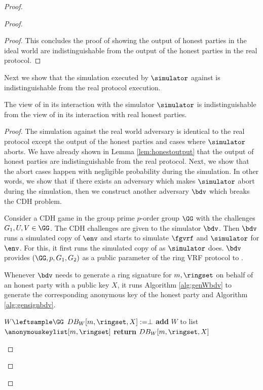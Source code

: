 \begin{proof}
\begin{proof}
\begin{proof}
			This concludes the proof of showing the output of honest parties in the ideal world are indistinguishable from the output of the honest parties in the real protocol.
		\end{proof}	
		
		Next we show that the simulation executed by $ \simulator $ against \adv is indistinguishable from the real protocol execution.
		
		\begin{lemma} 
			The view of \adv in its interaction with the simulator $ \simulator $ is indistinguishable from the view of \adv in its interaction with real honest parties.
		\end{lemma}
		
		
		\begin{proof}
			The  simulation against the real world adversary \adv is identical to the real protocol except the output of the honest parties and cases where $ \simulator $ aborts. We have already shown in Lemma \ref{lem:honestoutput} that the output of honest parties are indistinguishable from the real protocol. Next, we show that the abort cases happen with negligible probability during the simulation. In other words, we show that if there exists an adversary \adv which makes $ \simulator $ abort during the simulation, then we construct another adversary $ \bdv $ which breaks the CDH problem. 
			
			Consider a CDH game in the group prime $ p $-order group  $ \GG $ with the challenges $ G_1,U, V \in \GG$. The CDH challenges are given to the simulator $ \bdv $. Then $ \bdv $ runs a simulated copy of $ \env $ and starts to simulate $ \fgvrf $ and $ \simulator $ for $ \env $. For this, it first runs the simulated copy of \adv as $ \simulator $ does. $ \bdv $ provides $ (\GG, p, G_1 , G_2) $ as a public parameter of the ring VRF protocol to \adv.
			
			Whenever $ \bdv $ needs to generate a ring signature for $ m, \ringset $ on behalf of an honest party with a public key $ X $, it runs  Algorithm \ref{alg:genWbdv} to generate the corresponding anonymous key of the honest party and Algorithm \ref{alg:gensignbdv}. 
			
			\begin{algorithm}
				\caption{$\Gen_{W}(\ringset,X, m)$}
				\label{alg:genWbdv}	 	
				\begin{algorithmic}[1]
					\State $ W \leftsample \GG$
					\State $ DB_W[m,\ringset, X] := \perp $
					\State \textbf{add} $ W $ to list $ \anonymouskeylist[m,\ringset] $
					\EndIf
					\State \textbf{return} $ DB_W[m,\ringset, X] $
				\end{algorithmic}
			\end{algorithm}
			

\end{proof}
\end{proof}
\end{proof}
